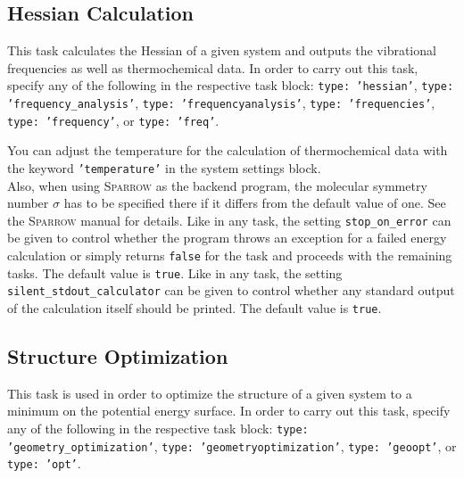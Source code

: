 \documentclass[]{tufte-book}
\begin{document}
\subsection{Hessian Calculation}

This task calculates the Hessian of a given system and outputs the vibrational frequencies as well as thermochemical data.
In order to carry out this task, specify any of the following in the respective task block: \texttt{type: 'hessian'},
\texttt{type: 'frequency\_analysis'}, \texttt{type: 'frequencyanalysis'}, \texttt{type: 'frequencies'}, \texttt{type: 'frequency'},
or \texttt{type: 'freq'}.

You can adjust the temperature for the calculation of thermochemical data with the keyword \texttt{'temperature'} in the system settings block.\\
Also, when using \textsc{Sparrow} %
as the backend program, the molecular symmetry number $\sigma$ has to be specified there if it differs from the
default value of one. See the \textsc{Sparrow} manual for details.
Like in any task, the setting \texttt{stop\_on\_error} can be given to control whether the program throws an exception for a failed energy calculation or simply returns \texttt{false} for the task and proceeds with the remaining tasks. The default value is \texttt{true}.
Like in any task, the setting \texttt{silent\_stdout\_calculator} can be given to control whether any standard output of the calculation itself should be printed. The default value is \texttt{true}.

\subsection{Structure Optimization}

This task is used in order to optimize the structure of a given system to a minimum on the potential energy surface. In
order to carry out this task, specify any of the following in the respective task block: \texttt{type: 'geometry\_optimization'},
\texttt{type: 'geometryoptimization'}, \texttt{type: 'geoopt'}, or \texttt{type: 'opt'}.
\end{document}
